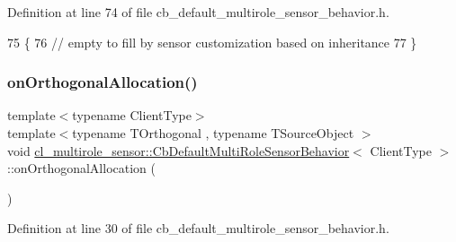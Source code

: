 Definition at line 74 of file cb\+\_\+default\+\_\+multirole\+\_\+sensor\+\_\+behavior.\+h.


\begin{DoxyCode}
75   \{
76     \textcolor{comment}{// empty to fill by sensor customization based on inheritance}
77   \}
\end{DoxyCode}
\mbox{\label{classcl__multirole__sensor_1_1CbDefaultMultiRoleSensorBehavior_a28b95d00ed02dde8779cc23101961294}} 
\subsubsection{\texorpdfstring{on\+Orthogonal\+Allocation()}{onOrthogonalAllocation()}}
{\footnotesize\ttfamily template$<$typename Client\+Type$>$ \\
template$<$typename T\+Orthogonal , typename T\+Source\+Object $>$ \\
void \hyperlink{classcl__multirole__sensor_1_1CbDefaultMultiRoleSensorBehavior}{cl\+\_\+multirole\+\_\+sensor\+::\+Cb\+Default\+Multi\+Role\+Sensor\+Behavior}$<$ Client\+Type $>$\+::on\+Orthogonal\+Allocation (\begin{DoxyParamCaption}{ }\end{DoxyParamCaption})\hspace{0.3cm}{\ttfamily [inline]}}



Definition at line 30 of file cb\+\_\+default\+\_\+multirole\+\_\+sensor\+\_\+behavior.\+h.


